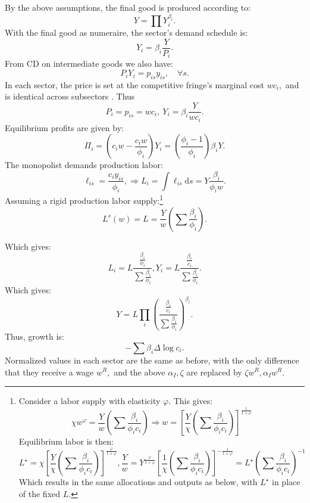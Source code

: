 By the above assumptions, the final good is produced according to:
\begin{equation}
Y=\prod Y_{i}^{\beta_{i}}.\label{eq: FinalY}
\end{equation}
With the final good as numeraire, the sector's demand schedule is:
\begin{equation}
Y_{i}=\beta_{i}\frac{Y}{P_{i}}.\label{eq: SectorY}
\end{equation}
From CD on intermediate goods we also have:
\[
P_{i}Y_{i}=p_{is}y_{is},\quad\forall s.
\]
In each sector, the price is set at the competitive fringe's marginal
cost $wc_{i},$ and is identical across subsectors . Thus
\begin{equation}
P_{i}=p_{is}=wc_{i},\ Y_{i}=\beta_{i}\frac{Y}{wc_{i}}.\label{eq: EqPY}
\end{equation}
Equilibrium profits are given by:
\[
\Pi_{i}=\left(c_{i}w-\frac{c_{i}w}{\phi_{i}}\right)Y_{i}=\left(\frac{\phi_{i}-1}{\phi_{i}}\right)\beta_{i}Y.
\]
The monopolist demands production labor:
\begin{equation}
\ell_{is}=\frac{c_{i}y_{is}}{\phi_{i}},\Rightarrow L_{i}=\int\ell_{is}\mathrm{d}s=Y\frac{\beta_{i}}{\phi_{i}w}.\label{eq: SectorL}
\end{equation}
Assuming a rigid production labor supply:\footnote{Consider a labor supply with elasticity $\varphi$. This gives:
\[
\chi w^{\varphi}=\frac{Y}{w}\left(\sum\frac{\beta_{i}}{\phi_{i}c_{i}}\right)\Rightarrow w=\left[\frac{Y}{\chi}\left(\sum\frac{\beta_{i}}{\phi_{i}c_{i}}\right)\right]^{\frac{1}{1+\varphi}}
\]
Equilibrium labor is then:
\[
L^{\star}=\chi\left[\frac{Y}{\chi}\left(\sum\frac{\beta_{i}}{\phi_{i}c_{i}}\right)\right]^{\frac{\varphi}{1+\varphi}},\frac{Y}{w}=Y^{\frac{\varphi}{1+\varphi}}\left[\frac{1}{\chi}\left(\sum\frac{\beta_{i}}{\phi_{i}c_{i}}\right)\right]^{-\frac{1}{1+\varphi}}=L^{\star}\left(\sum\frac{\beta_{i}}{\phi_{i}c_{i}}\right)^{-1}
\]
Which results in the same allocations and outputs as below, with $L^{\star}$
in place of the fixed $L$.}
\begin{equation}
L^{s}(w)=L=\frac{Y}{w}\left(\sum\frac{\beta_{i}}{\phi_{i}}\right).\label{eq: prodLClearing}
\end{equation}

Which gives:
\begin{equation}
L_{i}=L\frac{\frac{\beta_{i}}{\phi_{i}}}{\sum\frac{\beta_{i}}{\phi_{i}}},Y_{i}=L\frac{\frac{\beta_{i}}{c_{i}}}{\sum\frac{\beta_{i}}{\phi_{i}}}.\label{eq: EqSectorLY}
\end{equation}
Which gives:
\begin{equation}
Y=L\prod_{i}\left(\frac{\frac{\beta_{i}}{c_{i}}}{\sum\frac{\beta_{i}}{\phi_{i}}}\right)^{\beta_{i}}.\label{eq: EqFinalY}
\end{equation}
Thus, growth is:
\begin{equation}
-\sum\beta_{i}\Delta\log c_{i}.\label{eq: EqGrowth}
\end{equation}
Normalized values in each sector are the same as before, with the
only difference that they receive a wage $w^{R},$ and the above $\alpha_{I},\zeta$
are replaced by $\zeta w^{R},\alpha_{I}w^{R}.$

